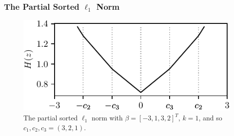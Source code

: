 \begin{frame}
  \frametitle{The Partial Sorted \(\ell_1\) Norm}

  \begin{figure}[htpb]
    \centering
    \includegraphics[scale=0.8]{figures/partial_slope.pdf}
    \caption{%
    The partial sorted \(\ell_1\) norm with \(\beta = [-3,1,3,2]^T\), \(k = 1\), and so
    \(c_1, c_2, c_3 = (3,2,1)\).
    }
    \label{fig:partial-sl1}
  \end{figure}
\end{frame}

